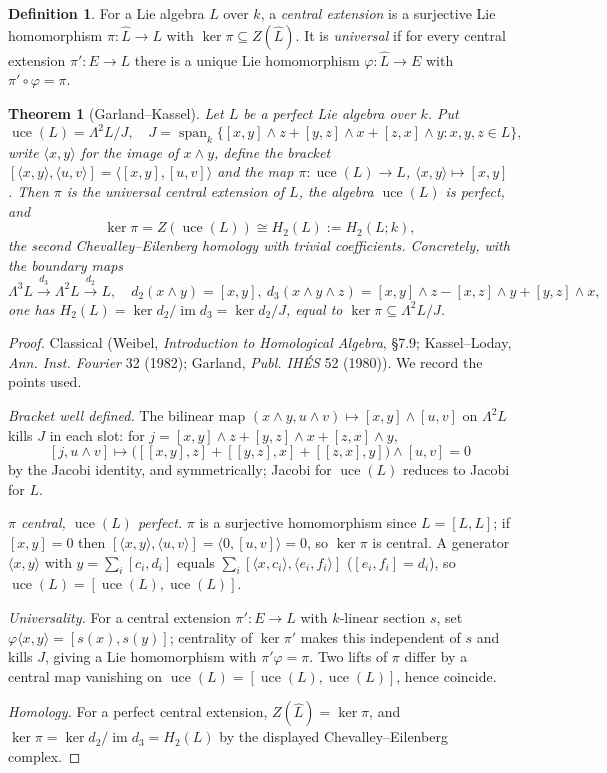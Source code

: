 \documentclass{amsart}
\newtheorem{theorem}{Theorem}
\theoremstyle{definition}
\newtheorem{definition}{Definition}
\DeclareMathOperator{\uce}{uce}
\DeclareMathOperator{\im}{im}
\newcommand{\ra}{\rightarrow}
\begin{document}
\begin{definition}\label{def:uce}
For a Lie algebra $L$ over $k$, a \emph{central extension} is a surjective Lie
homomorphism $\pi\colon \widehat L\ra L$ with $\ker\pi\subseteq Z(\widehat L)$. It
is \emph{universal} if for every central extension $\pi'\colon E\ra L$ there is a
unique Lie homomorphism $\varphi\colon\widehat L\ra E$ with
$\pi'\circ\varphi=\pi$.
\end{definition}

\begin{theorem}[Garland--Kassel]\label{thm:uce-exists}
Let $L$ be a perfect Lie algebra over $k$.  Put
\[
   \uce(L)=\Lambda^2L/J,\quad
   J=\operatorname{span}_k\{[x,y]\wedge z+[y,z]\wedge x+[z,x]\wedge y:x,y,z\in L\},
\]
write $\langle x,y\rangle$ for the image of $x\wedge y$, define the bracket
$[\langle x,y\rangle,\langle u,v\rangle]=\langle[x,y],[u,v]\rangle$ and the map
$\pi\colon\uce(L)\ra L$, $\langle x,y\rangle\mapsto[x,y]$.  Then $\pi$ is the
universal central extension of $L$, the algebra $\uce(L)$ is perfect, and
\[
   \ker\pi=Z(\uce(L))\cong H_2(L):=H_2(L;k),
\]
the second Chevalley--Eilenberg homology with trivial coefficients.  Concretely,
with the boundary maps
\[
   \Lambda^3L\xrightarrow{d_3}\Lambda^2L\xrightarrow{d_2}L,\quad
   d_2(x\wedge y)=[x,y],\
   d_3(x\wedge y\wedge z)=[x,y]\wedge z-[x,z]\wedge y+[y,z]\wedge x,
\]
one has $H_2(L)=\ker d_2/\im d_3=\ker d_2/J$, equal to $\ker\pi\subseteq\Lambda^2L/J$.
\end{theorem}

\begin{proof}
Classical (Weibel, \emph{Introduction to Homological Algebra}, \S7.9;
Kassel--Loday, \emph{Ann. Inst. Fourier} 32 (1982); Garland, \emph{Publ. IHÉS} 52
(1980)).  We record the points used.

\emph{Bracket well defined.}  The bilinear map
$(x\wedge y,u\wedge v)\mapsto[x,y]\wedge[u,v]$ on $\Lambda^2L$ kills $J$ in each
slot: for $j=[x,y]\wedge z+[y,z]\wedge x+[z,x]\wedge y$,
\[
   [j,u\wedge v]\mapsto\bigl([[x,y],z]+[[y,z],x]+[[z,x],y]\bigr)\wedge[u,v]=0
\]
by the Jacobi identity, and symmetrically; Jacobi for $\uce(L)$ reduces to Jacobi
for $L$.

\emph{$\pi$ central, $\uce(L)$ perfect.}  $\pi$ is a surjective homomorphism since
$L=[L,L]$; if $[x,y]=0$ then $[\langle x,y\rangle,\langle u,v\rangle]=
\langle0,[u,v]\rangle=0$, so $\ker\pi$ is central.  A generator $\langle
x,y\rangle$ with $y=\sum_i[c_i,d_i]$ equals $\sum_i[\langle x,c_i\rangle,\langle
e_i,f_i\rangle]$ ($[e_i,f_i]=d_i$), so $\uce(L)=[\uce(L),\uce(L)]$.

\emph{Universality.}  For a central extension $\pi'\colon E\ra L$ with $k$-linear
section $s$, set $\varphi\langle x,y\rangle=[s(x),s(y)]$; centrality of $\ker\pi'$
makes this independent of $s$ and kills $J$, giving a Lie homomorphism with
$\pi'\varphi=\pi$.  Two lifts of $\pi$ differ by a central map vanishing on
$\uce(L)=[\uce(L),\uce(L)]$, hence coincide.

\emph{Homology.}  For a perfect central extension, $Z(\widehat L)=\ker\pi$, and
$\ker\pi=\ker d_2/\im d_3=H_2(L)$ by the displayed Chevalley--Eilenberg complex.
\end{proof}
\end{document}
